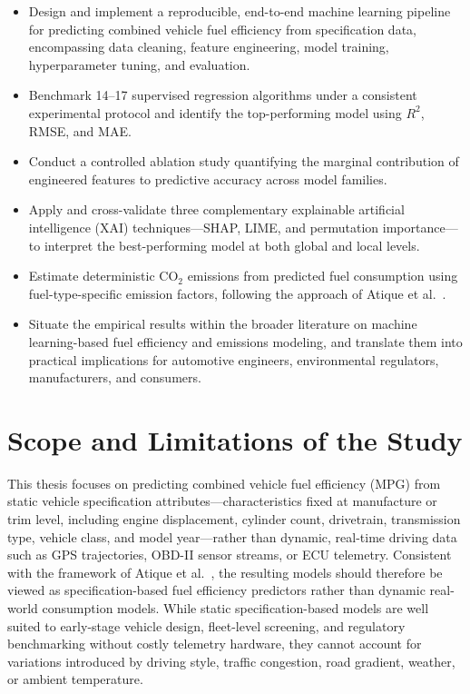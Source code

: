 \begin{itemize}
    \item Design and implement a reproducible, end-to-end machine learning pipeline for predicting combined vehicle fuel efficiency from specification data, encompassing data cleaning, feature engineering, model training, hyperparameter tuning, and evaluation.

    \item Benchmark 14--17 supervised regression algorithms under a consistent experimental protocol and identify the top-performing model using $R^2$, RMSE, and MAE.

    \item Conduct a controlled ablation study quantifying the marginal contribution of engineered features to predictive accuracy across model families.

    \item Apply and cross-validate three complementary explainable artificial intelligence (XAI) techniques---SHAP, LIME, and permutation importance---to interpret the best-performing model at both global and local levels.

    \item Estimate deterministic CO$_2$ emissions from predicted fuel consumption using fuel-type-specific emission factors, following the approach of Atique et al.~\cite{atique2026explainable}.

    \item Situate the empirical results within the broader literature on machine learning-based fuel efficiency and emissions modeling, and translate them into practical implications for automotive engineers, environmental regulators, manufacturers, and consumers.
\end{itemize}

\section{Scope and Limitations of the Study}

This thesis focuses on predicting combined vehicle fuel efficiency (MPG) from static vehicle specification attributes---characteristics fixed at manufacture or trim level, including engine displacement, cylinder count, drivetrain, transmission type, vehicle class, and model year---rather than dynamic, real-time driving data such as GPS trajectories, OBD-II sensor streams, or ECU telemetry. Consistent with the framework of Atique et al.~\cite{atique2026explainable}, the resulting models should therefore be viewed as specification-based fuel efficiency predictors rather than dynamic real-world consumption models. While static specification-based models are well suited to early-stage vehicle design, fleet-level screening, and regulatory benchmarking without costly telemetry hardware, they cannot account for variations introduced by driving style, traffic congestion, road gradient, weather, or ambient temperature.

